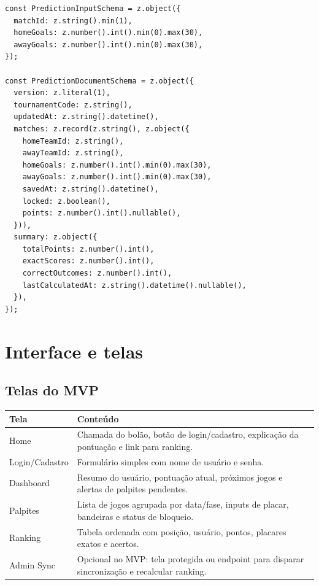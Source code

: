 \documentclass[12pt,a4paper]{article}
\begin{document}
\begin{lstlisting}[language={},caption={Schema conceitual de palpite em TypeScript/Zod}]
const PredictionInputSchema = z.object({
  matchId: z.string().min(1),
  homeGoals: z.number().int().min(0).max(30),
  awayGoals: z.number().int().min(0).max(30),
});

const PredictionDocumentSchema = z.object({
  version: z.literal(1),
  tournamentCode: z.string(),
  updatedAt: z.string().datetime(),
  matches: z.record(z.string(), z.object({
    homeTeamId: z.string(),
    awayTeamId: z.string(),
    homeGoals: z.number().int().min(0).max(30),
    awayGoals: z.number().int().min(0).max(30),
    savedAt: z.string().datetime(),
    locked: z.boolean(),
    points: z.number().int().nullable(),
  })),
  summary: z.object({
    totalPoints: z.number().int(),
    exactScores: z.number().int(),
    correctOutcomes: z.number().int(),
    lastCalculatedAt: z.string().datetime().nullable(),
  }),
});
\end{lstlisting}

\section{Interface e telas}

\subsection{Telas do MVP}

\begin{longtable}{p{}p{}}
\toprule
\textbf{Tela} & \textbf{Conteúdo} \\
\midrule
Home & Chamada do bolão, botão de login/cadastro, explicação da pontuação e link para ranking. \\
Login/Cadastro & Formulário simples com nome de usuário e senha. \\
Dashboard & Resumo do usuário, pontuação atual, próximos jogos e alertas de palpites pendentes. \\
Palpites & Lista de jogos agrupada por data/fase, inputs de placar, bandeiras e status de bloqueio. \\
Ranking & Tabela ordenada com posição, usuário, pontos, placares exatos e acertos. \\
Admin Sync & Opcional no MVP: tela protegida ou endpoint para disparar sincronização e recalcular ranking. \\
\bottomrule
\end{longtable}
\end{document}

